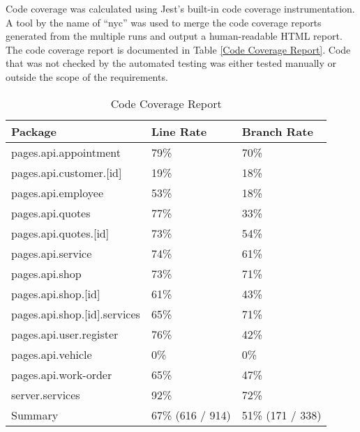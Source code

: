 \documentclass[12pt, titlepage]{article}
\begin{document}
Code coverage was calculated using Jest's built-in code coverage instrumentation. A tool by the
name of ``nyc'' was used to merge the code coverage reports generated from the multiple runs and
output a human-readable HTML report. The code coverage report is documented in Table \ref{Code
	Coverage Report}. Code that was not checked by the automated testing was either tested manually or
outside the scope of the requirements.

\begin{table}[H]
	\centering
	\caption{Code Coverage Report} \label{Code Coverage Report}
	\begin{tabular}{|l|l|l|}
		\hline
		\textbf{Package}             & \textbf{Line Rate} & \textbf{Branch Rate} \\
		\hline
		pages.api.appointment        & 79\%               & 70\%                 \\
		\hline
		pages.api.customer.[id]      & 19\%               & 18\%                 \\
		\hline
		pages.api.employee           & 53\%               & 18\%                 \\
		\hline
		pages.api.quotes             & 77\%               & 33\%                 \\
		\hline
		pages.api.quotes.[id]        & 73\%               & 54\%                 \\
		\hline
		pages.api.service            & 74\%               & 61\%                 \\
		\hline
		pages.api.shop               & 73\%               & 71\%                 \\
		\hline
		pages.api.shop.[id]          & 61\%               & 43\%                 \\
		\hline
		pages.api.shop.[id].services & 65\%               & 71\%                 \\
		\hline
		pages.api.user.register      & 76\%               & 42\%                 \\
		\hline
		pages.api.vehicle            & 0\%                & 0\%                  \\
		\hline
		pages.api.work-order         & 65\%               & 47\%                 \\
		\hline
		server.services              & 92\%               & 72\%                 \\
		\hline
		Summary                      & 67\% (616 / 914)   & 51\% (171 / 338)     \\
		\hline
	\end{tabular}
\end{table}
\end{document}
